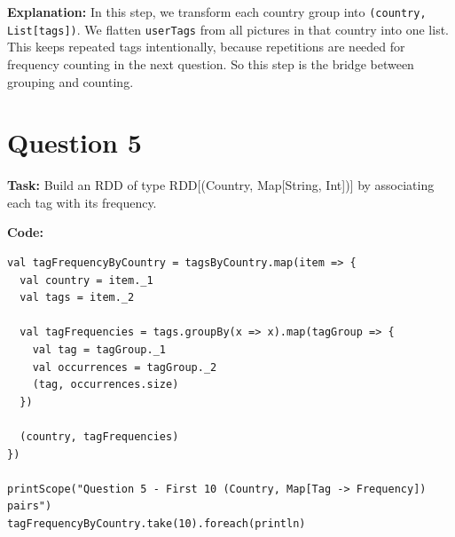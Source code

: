 \documentclass[11pt]{article}
\begin{document}
\textbf{Explanation:} In this step, we transform each country group into \texttt{(country, List[tags])}. We flatten \texttt{userTags} from all pictures in that country into one list. This keeps repeated tags intentionally, because repetitions are needed for frequency counting in the next question. So this step is the bridge between grouping and counting.

\section*{Question 5}
\textbf{Task:} Build an RDD of type RDD[(Country, Map[String, Int])] by associating each tag with its frequency.

\textbf{Code:}
\begin{lstlisting}
val tagFrequencyByCountry = tagsByCountry.map(item => {
  val country = item._1
  val tags = item._2
  
  val tagFrequencies = tags.groupBy(x => x).map(tagGroup => {
    val tag = tagGroup._1
    val occurrences = tagGroup._2
    (tag, occurrences.size)
  })
  
  (country, tagFrequencies)
})

printScope("Question 5 - First 10 (Country, Map[Tag -> Frequency]) pairs")
tagFrequencyByCountry.take(10).foreach(println)
\end{lstlisting}
\end{document}
